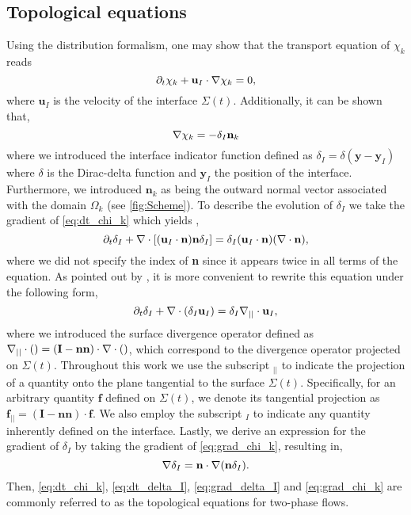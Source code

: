 \subsection{Topological equations}
Using the distribution formalism, one may show that the transport equation of $\chi_k$ reads\citep{drew1983mathematical} 
\begin{equation}
    \partial_t \chi_k
    + \textbf{u}_I \cdot \mathbf{\nabla} \chi_k
    = 0,
    \label{eq:dt_chi_k}
\end{equation}
where $\textbf{u}_I$ is the velocity of the interface $\Sigma(t)$.
Additionally, it can be shown  \citep{drew1983mathematical} that,
\begin{equation}
    \mathbf{\nabla} \chi_k
    = - \delta_I \textbf{n}_k
    \label{eq:grad_chi_k}
\end{equation}
where we introduced the interface indicator function defined as $\delta_I = \delta(\textbf{y}-\textbf{y}_I)$ where $\delta$ is the Dirac-delta function and $\textbf{y}_I$ the position of the interface. 
Furthermore, we introduced $\textbf{n}_k$ as being the outward normal vector associated with the domain $\Omega_k$ (see \ref{fig:Scheme}).
To describe the evolution of $\delta_I$ we take the gradient of \ref{eq:dt_chi_k} which yields \citep{morel2015mathematical},
\begin{equation}
    \partial_t \delta_I
    + \mathbf{\nabla} \cdot \left[(\textbf{u}_I\cdot\textbf{n})\textbf{n} \delta_I\right]
    = \delta_I (\textbf{u}_I\cdot\textbf{n})(\mathbf{\nabla} \cdot\textbf{n}),
\end{equation}
where we did not specify the index of \textbf{n} since it appears twice in all terms of the equation. 
As pointed out by \citet{morel2007surface}, it is more convenient to rewrite this equation under the following form,
\begin{equation}
    \partial_t \delta_I
    + \mathbf{\nabla} \cdot (\delta_I \textbf{u}_I)
    = \delta_I \mathbf{\nabla}_{||} \cdot \textbf{u}_I,
    \label{eq:dt_delta_I}
\end{equation}
where we introduced the surface divergence operator defined as $\mathbf{\nabla}_{||} \cdot ()= (\textbf{I}-\textbf{nn})\cdot \mathbf{\nabla} \cdot ()$, which correspond to the divergence operator projected on $\Sigma(t)$. 
Throughout this work we use the subscript  $_{||}$ to indicate the projection of a quantity onto the plane tangential to the surface $\Sigma(t)$. 
Specifically, for an arbitrary quantity $\textbf{f}$ defined on $\Sigma(t)$, we denote its tangential projection as $\textbf{f}_{||} = (\textbf{I}-\textbf{nn})\cdot \textbf{f}$. 
We also employ the subscript $_I$ to indicate any quantity inherently defined on the interface. 
Lastly, we derive an expression for the gradient of $\delta_I$ by taking the gradient of \ref{eq:grad_chi_k}, resulting in,
\begin{equation}
    \mathbf{\nabla}\delta_I 
    = \textbf{n} \cdot \mathbf{\nabla} (\textbf{n} \delta_I).
    \label{eq:grad_delta_I}
\end{equation}
Then, \ref{eq:dt_chi_k}, \ref{eq:dt_delta_I}, \ref{eq:grad_delta_I} and \ref{eq:grad_chi_k} are commonly referred to as the topological equations for two-phase flows.


